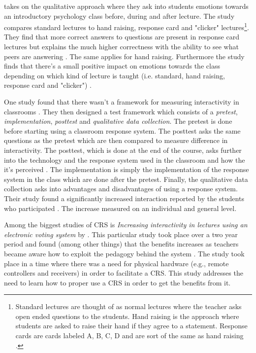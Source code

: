  takes on the qualitative approach where they ask into students emotions towards an introductory psychology class before, during and after lecture. The study compares standard lectures to hand raising, response card and "clicker" lectures\footnote{Standard lectures are thought of as normal lectures where the teacher asks open ended questions to the students. Hand raising is the approach where students are asked to raise their hand if they agree to a statement. Response cards are cards labeled A, B, C, D and are sort of the same as hand raising \cite[p.~254]{stowell2007benefits}.}.
They find that more correct answers to questions are present in response card lectures but explains the much higher correctness with the ability to see what peers are answering \cite[p.~257]{stowell2007benefits}. The same applies for hand raising. Furthermore the study finds that there's a small positive impact on emotions towards the class depending on which kind of lecture is taught (i.e. standard, hand raising, response card and "clicker") \cite{stowell2007benefits}.

One study found that there wasn't a framework for measuring interactivity in classrooms \cite[p.~400]{siau2006use}. They then designed a test framework which consists of a \emph{pretest}, \emph{implementation}, \emph{posttest} and \emph{qualitative data collection}. The pretest is done before starting using a classroom response system. The posttest asks the same questions as the pretest which are then compared to measure difference in interactivity. The posttest, which is done at the end of the course, asks further into the technology and the response system used in the classroom and how the it's perceived \cite{siau2006use}. The implementation is simply the implementation of the response system in the class which are done after the pretest. Finally, the qualitative data collection asks into advantages and disadvantages of using a response system. Their study found a significantly increased interaction reported by the students who participated \cite[p.~400]{siau2006use}. The increase measured on an individual and general level. 


Among the biggest studies of CRS is \emph{Increasing interactivity in lectures using an electronic voting system} by . This particular study took place over a two year period and found (among other things) that the benefits increases as teachers became aware how to exploit the pedagogy behind the system \cite[p.~93]{draper2004increasing}. The study took place in a time where there was a need for physical hardware (e.g., remote controllers and receivers) in order to facilitate a CRS. This study addresses the need to learn how to proper use a CRS in order to get the benefits from it.

